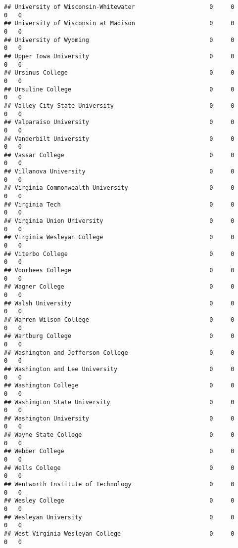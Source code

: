 \documentclass[
]{article}
\begin{document}
\begin{verbatim}
## University of Wisconsin-Whitewater                     0     0        0   0
## University of Wisconsin at Madison                     0     0        0   0
## University of Wyoming                                  0     0        0   0
## Upper Iowa University                                  0     0        0   0
## Ursinus College                                        0     0        0   0
## Ursuline College                                       0     0        0   0
## Valley City State University                           0     0        0   0
## Valparaiso University                                  0     0        0   0
## Vanderbilt University                                  0     0        0   0
## Vassar College                                         0     0        0   0
## Villanova University                                   0     0        0   0
## Virginia Commonwealth University                       0     0        0   0
## Virginia Tech                                          0     0        0   0
## Virginia Union University                              0     0        0   0
## Virginia Wesleyan College                              0     0        0   0
## Viterbo College                                        0     0        0   0
## Voorhees College                                       0     0        0   0
## Wagner College                                         0     0        0   0
## Walsh University                                       0     0        0   0
## Warren Wilson College                                  0     0        0   0
## Wartburg College                                       0     0        0   0
## Washington and Jefferson College                       0     0        0   0
## Washington and Lee University                          0     0        0   0
## Washington College                                     0     0        0   0
## Washington State University                            0     0        0   0
## Washington University                                  0     0        0   0
## Wayne State College                                    0     0        0   0
## Webber College                                         0     0        0   0
## Wells College                                          0     0        0   0
## Wentworth Institute of Technology                      0     0        0   0
## Wesley College                                         0     0        0   0
## Wesleyan University                                    0     0        0   0
## West Virginia Wesleyan College                         0     0        0   0

\end{verbatim}
\end{document}
